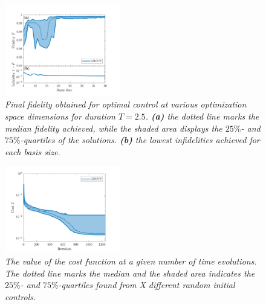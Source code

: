 \documentclass[%
 reprint,
 amsmath,amssymb,
 aps,
pra,
]{revtex4-1}
\begin{document}
\begin{figure}[h!]
    \centering
    \includegraphics[width=0.45\textwidth]{Figures/FidelityBasisSize.pdf}
    \caption{\textit{Final fidelity obtained for optimal control at various optimization space dimensions for duration $T = 2.5$. \textbf{(a)} the dotted line marks the median fidelity achieved, while the shaded area displays the $25\%$- and $75\%$-quartiles of the solutions. \textbf{(b)} the lowest infidelities achieved for each basis size.}}
    \label{fig:FidelityBasisSize}
\end{figure}

\begin{figure}[h!]
    \centering
    \includegraphics[width=0.45\textwidth]{Figures/CostProgress.pdf}
    \caption{\textit{The value of the cost function at a given number of time evolutions. The dotted line marks the median and the shaded area indicates the $25\%$- and $75\%$-quartiles found from X different random initial controls.}}
    \label{fig:FidelityBasisSize5}
\end{figure}


%

\end{document}
